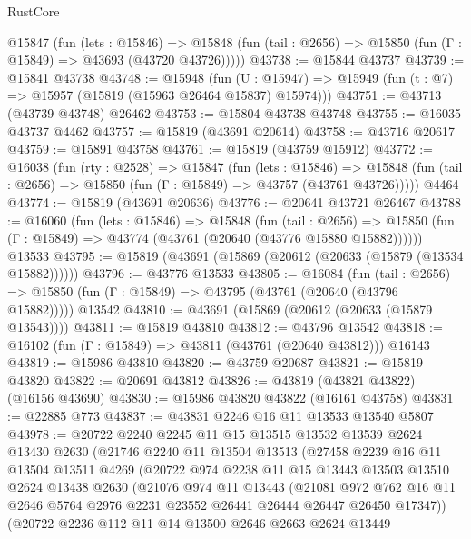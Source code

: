 \begin{lexlean}{RustCore}
\begin{coremodule}
    @15847
      (fun (lets : @15846) =>
      @15848 (fun (tail : @2656) => @15850 (fun (Γ : @15849) => @43693 (@43720 @43726)))))
@43738 := @15844 @43737
@43739 := @15841 @43738
@43748 := @15948
    (fun (U : @15947) => @15949 (fun (t : @7) => @15957 (@15819 (@15963 @26464 @15837) @15974)))
@43751 := @43713 (@43739 @43748) @26462
@43753 := @15804 @43738 @43748
@43755 := @16035 @43737 @4462
@43757 := @15819 (@43691 @20614)
@43758 := @43716 @20617
@43759 := @15891 @43758
@43761 := @15819 (@43759 @15912)
@43772 := @16038
    (fun (rty : @2528) =>
    @15847
      (fun (lets : @15846) =>
      @15848 (fun (tail : @2656) => @15850 (fun (Γ : @15849) => @43757 (@43761 @43726)))))
    @4464
@43774 := @15819 (@43691 @20636)
@43776 := @20641 @43721 @26467
@43788 := @16060
    (fun (lets : @15846) =>
    @15848
      (fun (tail : @2656) =>
      @15850 (fun (Γ : @15849) => @43774 (@43761 (@20640 (@43776 @15880 @15882))))))
    @13533
@43795 := @15819 (@43691 (@15869 (@20612 (@20633 (@15879 (@13534 @15882))))))
@43796 := @43776 @13533
@43805 := @16084
    (fun (tail : @2656) => @15850 (fun (Γ : @15849) => @43795 (@43761 (@20640 (@43796 @15882)))))
    @13542
@43810 := @43691 (@15869 (@20612 (@20633 (@15879 @13543))))
@43811 := @15819 @43810
@43812 := @43796 @13542
@43818 := @16102 (fun (Γ : @15849) => @43811 (@43761 (@20640 @43812))) @16143
@43819 := @15986 @43810
@43820 := @43759 @20687
@43821 := @15819 @43820
@43822 := @20691 @43812
@43826 := @43819 (@43821 @43822) (@16156 @43690)
@43830 := @15986 @43820 @43822 (@16161 @43758)
@43831 := @22885 @773
@43837 := @43831 @2246 @16 @11 @13533 @13540 @5807
@43978 := @20722
    @2240
    @2245
    @11
    @15
    @13515
    @13532
    @13539
    @2624
    @13430
    @2630
    (@21746
      @2240
      @11
      @13504
      @13513
      (@27458
        @2239
        @16
        @11
        @13504
        @13511
        @4269
        (@20722
          @974
          @2238
          @11
          @15
          @13443
          @13503
          @13510
          @2624
          @13438
          @2630
          (@21076
            @974
            @11
            @13443
            (@21081
              @972
              @762
              @16
              @11
              @2646
              @5764
              @2976
              @2231
              @23552
              @26441
              @26444
              @26447
              @26450
              @17347))
          (@20722
            @2236
            @112
            @11
            @14
            @13500
            @2646
            @2663
            @2624
            @13449

\end{coremodule}
\end{lexlean}
